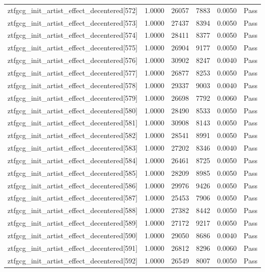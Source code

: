 \begin{table}[htbp]
\begin{tabular}{llrrll}
ztfgcg\_init\_artist\_effect\_decentered[572] & 1.0000 & 26057 & 7883 & 0.0050 & Pass \\
ztfgcg\_init\_artist\_effect\_decentered[573] & 1.0000 & 27437 & 8394 & 0.0050 & Pass \\
ztfgcg\_init\_artist\_effect\_decentered[574] & 1.0000 & 28411 & 8377 & 0.0050 & Pass \\
ztfgcg\_init\_artist\_effect\_decentered[575] & 1.0000 & 26904 & 9177 & 0.0050 & Pass \\
ztfgcg\_init\_artist\_effect\_decentered[576] & 1.0000 & 30902 & 8247 & 0.0040 & Pass \\
ztfgcg\_init\_artist\_effect\_decentered[577] & 1.0000 & 26877 & 8253 & 0.0050 & Pass \\
ztfgcg\_init\_artist\_effect\_decentered[578] & 1.0000 & 29337 & 9003 & 0.0040 & Pass \\
ztfgcg\_init\_artist\_effect\_decentered[579] & 1.0000 & 26698 & 7792 & 0.0060 & Pass \\
ztfgcg\_init\_artist\_effect\_decentered[580] & 1.0000 & 28490 & 8533 & 0.0050 & Pass \\
ztfgcg\_init\_artist\_effect\_decentered[581] & 1.0000 & 30908 & 8143 & 0.0050 & Pass \\
ztfgcg\_init\_artist\_effect\_decentered[582] & 1.0000 & 28541 & 8991 & 0.0050 & Pass \\
ztfgcg\_init\_artist\_effect\_decentered[583] & 1.0000 & 27202 & 8346 & 0.0040 & Pass \\
ztfgcg\_init\_artist\_effect\_decentered[584] & 1.0000 & 26461 & 8725 & 0.0050 & Pass \\
ztfgcg\_init\_artist\_effect\_decentered[585] & 1.0000 & 28209 & 8985 & 0.0050 & Pass \\
ztfgcg\_init\_artist\_effect\_decentered[586] & 1.0000 & 29976 & 9426 & 0.0050 & Pass \\
ztfgcg\_init\_artist\_effect\_decentered[587] & 1.0000 & 25453 & 7906 & 0.0050 & Pass \\
ztfgcg\_init\_artist\_effect\_decentered[588] & 1.0000 & 27382 & 8442 & 0.0050 & Pass \\
ztfgcg\_init\_artist\_effect\_decentered[589] & 1.0000 & 27172 & 9217 & 0.0050 & Pass \\
ztfgcg\_init\_artist\_effect\_decentered[590] & 1.0000 & 29050 & 8686 & 0.0040 & Pass \\
ztfgcg\_init\_artist\_effect\_decentered[591] & 1.0000 & 26812 & 8296 & 0.0060 & Pass \\
ztfgcg\_init\_artist\_effect\_decentered[592] & 1.0000 & 26549 & 8007 & 0.0050 & Pass \\

\end{tabular}
\end{table}
